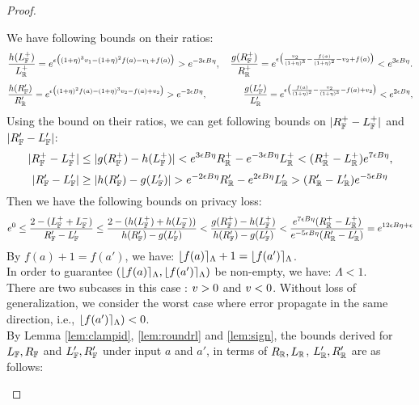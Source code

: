 \documentclass[a4paper,11pt]{article}
\begin{document}
\begin{proof}
\begin{itemize}
		We have following bounds on their ratios:
		\[
		\frac{h(L_{\mathbb{F}}^+)}{L_{\mathbb{R}}^+} 
		= e^{\epsilon 
		\big(
		(1 + \eta)^3 v_1 - (1 + \eta)^2f(a) - v_1 + f(a)
		\big)}
		> e^{-3\epsilon B \eta},
		~~~
		\frac{g{(R_{\mathbb{F}}^+)}}{R_{\mathbb{R}}^+} = e^{\epsilon 
		\big(
		\frac{v_2}{(1 + \eta)^3} - \frac{f(a)}{(1 + \eta)^2} - v_2 + f(a)
		\big)}
		< e^{3\epsilon B \eta}.
		\]
		\[
		\frac{h(R_{\mathbb{F}}')}{R_{\mathbb{R}}'} = e^{\epsilon 
		\big(
		(1 + \eta)^2f(a) - (1 + \eta)^3 v_2 - f(a) + v_2
		\big)}
		> e^{-2\epsilon B \eta},
		~~~~~~~~~~~~
		\frac{g{(L_{\mathbb{F}}')}}{L_{\mathbb{R}}'} = e^{\epsilon 
		\big(
		\frac{f(a)}{(1 + \eta)^2} - \frac{v_2}{(1 + \eta)^3} - f(a) + v_2
		\big)}
		< e^{2\epsilon B \eta},
		\]
		Using the bound on their ratios, we can get following bounds on $|R_{\mathbb{F}}^+ - L_{\mathbb{F}}^+|$ 
		and $|R_{\mathbb{F}}' - L_{\mathbb{F}}'|$:
		\[
		|R_{\mathbb{F}}^+ - L_{\mathbb{F}}^+|
		\leq
		|g{(R_{\mathbb{F}}^+)} - h(L_{\mathbb{F}}^+)| 
		< e^{3\epsilon B \eta} R_{\mathbb{R}}^+ - e^{-3\epsilon B \eta}L_{\mathbb{R}}^+ 
		< (R_{\mathbb{R}}^+ - L_{\mathbb{R}}^+) e^{7\epsilon B \eta},
		\]
		\[
		|R_{\mathbb{F}}' - L_{\mathbb{F}}'|
		\geq
		|h{(R_{\mathbb{F}}')} - g(L_{\mathbb{F}}')| 
		> e^{-2\epsilon B \eta} R_{\mathbb{R}}' - e^{2\epsilon B \eta}L_{\mathbb{R}}' 
		> (R_{\mathbb{R}}' - L_{\mathbb{R}}') e^{-5\epsilon B \eta}
		\]
		Then we have the following bounds on privacy loss:
		\[
		e^0
		\leq
		\frac{2 - (L_{\mathbb{F}}^+ + L_{\mathbb{F}}^-)}
		{R_{\mathbb{F}}' - L_{\mathbb{F}}'}
		\leq
		\frac{2 - (h(L_{\mathbb{F}}^+) + h(L_{\mathbb{F}}^-))}
		{h(R_{\mathbb{F}}') - g(L_{\mathbb{F}}')}
		< \frac{g(R_{\mathbb{F}}^+) - h(L_{\mathbb{F}}^+)}
		{h(R_{\mathbb{F}}') - g(L_{\mathbb{F}}')}
		< \frac{e^{7\epsilon B \eta}
		(R_{\mathbb{R}}^+ - L_{\mathbb{R}}^+)}
		{e^{-5\epsilon B \eta} 
		(R_{\mathbb{R}}' - L_{\mathbb{R}}')}
		= e^{12\epsilon B \eta + \epsilon}
		\]
		By $f(a) + 1 = f(a')$, we have:
		$\lfloor f(a) \rceil_{\Lambda} + 1 = \lfloor f(a') \rceil_{\Lambda}$.
		\\
		In order to guarantee $(\lfloor f(a) \rceil_{\Lambda}, \lfloor f(a') \rceil_{\Lambda})$ be non-empty, we  have: 
		$\Lambda < 1$.
		\\
		There are two subcases in this case : 
		$v >0$ and $v < 0$.
		Without loss of generalization, we consider the worst case where error propagate in the same direction, i.e., $\lfloor f(a') \rceil_{\Lambda}) < 0$.
		\\
		By Lemma \ref{lem:clampid}, \ref{lem:roundrl} and \ref{lem:sign}, the bounds derived for 
		$L_{\mathbb{F}}, R_{\mathbb{F}}$ and $L_{\mathbb{F}}', R_{\mathbb{F}}'$ under input $a$ and $a'$, in terms of $R_{\mathbb{R}}, L_{\mathbb{R}}$, $L_{\mathbb{R}}', R_{\mathbb{R}}'$ are as follows:
		\\

\end{itemize}
\end{proof}
\end{document}
